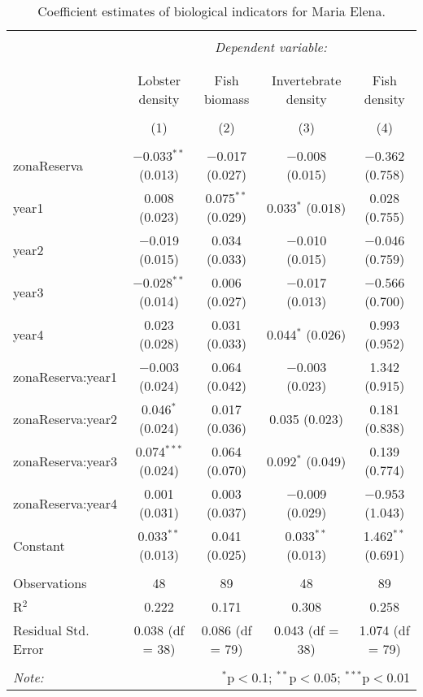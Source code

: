 
\begin{table}[!htbp] \centering 
  \caption{Coefficient estimates of biological indicators for Maria Elena.} 
  \label{} 
\small 
\begin{tabular}{@{\extracolsep{1pt}}lcccc} 
\\[-1.8ex]\hline 
\hline \\[-1.8ex] 
 & \multicolumn{4}{c}{\textit{Dependent variable:}} \\ 
\cline{2-5} 
\\[-1.8ex] & \multicolumn{4}{c}{} \\ 
 & Lobster density & Fish biomass & Invertebrate density & Fish density \\ 
\\[-1.8ex] & (1) & (2) & (3) & (4)\\ 
\hline \\[-1.8ex] 
 zonaReserva & $-$0.033$^{**}$ (0.013) & $-$0.017 (0.027) & $-$0.008 (0.015) & $-$0.362 (0.758) \\ 
  year1 & 0.008 (0.023) & 0.075$^{**}$ (0.029) & 0.033$^{*}$ (0.018) & 0.028 (0.755) \\ 
  year2 & $-$0.019 (0.015) & 0.034 (0.033) & $-$0.010 (0.015) & $-$0.046 (0.759) \\ 
  year3 & $-$0.028$^{**}$ (0.014) & 0.006 (0.027) & $-$0.017 (0.013) & $-$0.566 (0.700) \\ 
  year4 & 0.023 (0.028) & 0.031 (0.033) & 0.044$^{*}$ (0.026) & 0.993 (0.952) \\ 
  zonaReserva:year1 & $-$0.003 (0.024) & 0.064 (0.042) & $-$0.003 (0.023) & 1.342 (0.915) \\ 
  zonaReserva:year2 & 0.046$^{*}$ (0.024) & 0.017 (0.036) & 0.035 (0.023) & 0.181 (0.838) \\ 
  zonaReserva:year3 & 0.074$^{***}$ (0.024) & 0.064 (0.070) & 0.092$^{*}$ (0.049) & 0.139 (0.774) \\ 
  zonaReserva:year4 & 0.001 (0.031) & 0.003 (0.037) & $-$0.009 (0.029) & $-$0.953 (1.043) \\ 
  Constant & 0.033$^{**}$ (0.013) & 0.041 (0.025) & 0.033$^{**}$ (0.013) & 1.462$^{**}$ (0.691) \\ 
 \hline \\[-1.8ex] 
Observations & 48 & 89 & 48 & 89 \\ 
R$^{2}$ & 0.222 & 0.171 & 0.308 & 0.258 \\ 
Residual Std. Error & 0.038 (df = 38) & 0.086 (df = 79) & 0.043 (df = 38) & 1.074 (df = 79) \\ 
\hline 
\hline \\[-1.8ex] 
\textit{Note:}  & \multicolumn{4}{r}{$^{*}$p$<$0.1; $^{**}$p$<$0.05; $^{***}$p$<$0.01} \\ 
\end{tabular} 
\end{table} 
